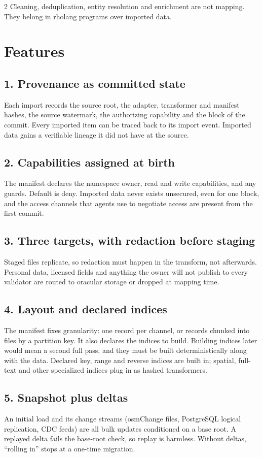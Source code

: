 \documentclass[10pt]{article}
\begin{document}
\begin{multicols}{2}
Cleaning, deduplication, entity resolution and enrichment are not mapping. They
belong in rholang programs over imported data.

\section{Features}

\subsection{1. Provenance as committed state}
Each import records the source root, the adapter, transformer and manifest
hashes, the source watermark, the authorizing capability and the block of the
commit. Every imported item can be traced back to its import event. Imported data
gains a verifiable lineage it did not have at the source.

\subsection{2. Capabilities assigned at birth}
The manifest declares the namespace owner, read and write capabilities, and any
guards. Default is deny. Imported data never exists unsecured, even for one block,
and the access channels that agents use to negotiate access are present from the
first commit.

\subsection{3. Three targets, with redaction before staging}
Staged files replicate, so redaction must happen in the transform, not afterwards.
Personal data, licensed fields and anything the owner will not publish to every
validator are routed to oracular storage or dropped at mapping time.

\subsection{4. Layout and declared indices}
The manifest fixes granularity: one record per channel, or records chunked into
files by a partition key. It also declares the indices to build. Building indices
later would mean a second full pass, and they must be built deterministically
along with the data. Declared key, range and reverse indices are built in; spatial,
full-text and other specialized indices plug in as hashed transformers.

\subsection{5. Snapshot plus deltas}
An initial load and its change streams (osmChange files, PostgreSQL logical
replication, CDC feeds) are all bulk updates conditioned on a base root. A replayed
delta fails the base-root check, so replay is harmless. Without deltas, ``rolling
in'' stops at a one-time migration.


\end{multicols}
\end{document}
